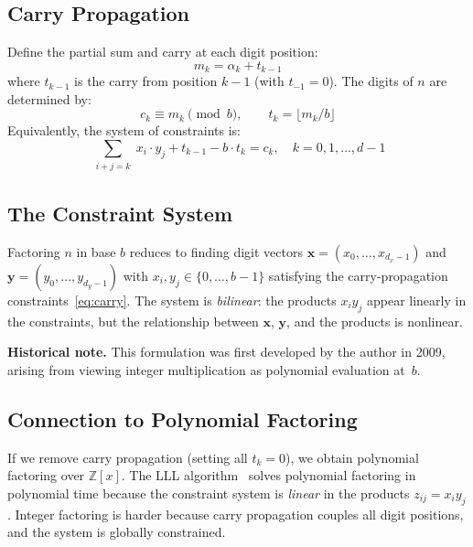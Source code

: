 \documentclass[11pt,a4paper]{article}
\begin{document}
\subsection{Carry Propagation}

Define the partial sum and carry at each digit position:
\begin{equation}
m_k = \alpha_k + t_{k-1}
\end{equation}
where $t_{k-1}$ is the carry from position $k-1$ (with $t_{-1} = 0$). The digits of $n$ are determined by:
\begin{equation}
c_k \equiv m_k \pmod{b}, \qquad t_k = \lfloor m_k / b \rfloor
\end{equation}
Equivalently, the system of constraints is:
\begin{equation}\label{eq:carry}
\sum_{\substack{i+j=k}} x_i \cdot y_j + t_{k-1} - b \cdot t_k = c_k, \quad k = 0, 1, \ldots, d-1
\end{equation}

\subsection{The Constraint System}

Factoring $n$ in base $b$ reduces to finding digit vectors $\mathbf{x} = (x_0, \ldots, x_{d_x-1})$ and $\mathbf{y} = (y_0, \ldots, y_{d_y-1})$ with $x_i, y_j \in \{0, \ldots, b-1\}$ satisfying the carry-propagation constraints~\eqref{eq:carry}. The system is \emph{bilinear}: the products $x_i y_j$ appear linearly in the constraints, but the relationship between $\mathbf{x}$, $\mathbf{y}$, and the products is nonlinear.

\textbf{Historical note.} This formulation was first developed by the author in 2009, arising from viewing integer multiplication as polynomial evaluation at~$b$.

\subsection{Connection to Polynomial Factoring}

If we remove carry propagation (setting all $t_k = 0$), we obtain polynomial factoring over $\mathbb{Z}[x]$. The LLL algorithm~\cite{lll82} solves polynomial factoring in polynomial time because the constraint system is \emph{linear} in the products $z_{ij} = x_i y_j$. Integer factoring is harder because carry propagation couples all digit positions, and the system is globally constrained.
\end{document}
